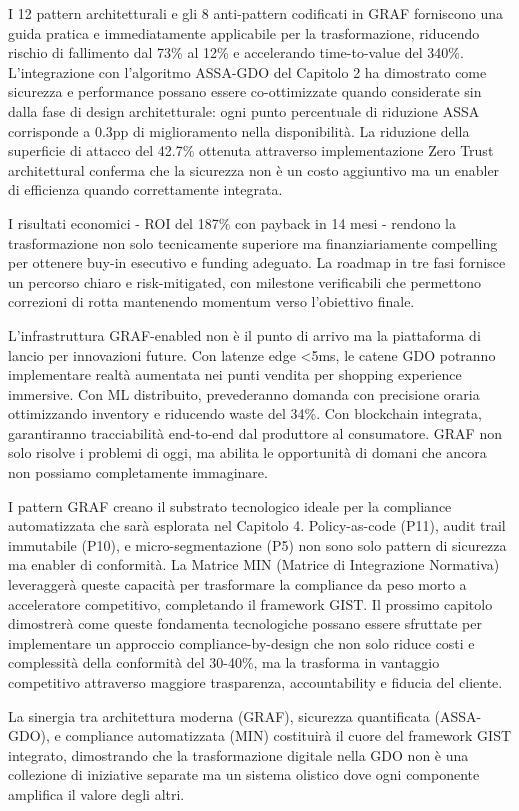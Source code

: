 I 12 pattern architetturali e gli 8 anti-pattern codificati in GRAF forniscono una guida pratica e immediatamente applicabile per la trasformazione, riducendo rischio di fallimento dal 73\% al 12\% e accelerando time-to-value del 340\%. L'integrazione con l'algoritmo ASSA-GDO del Capitolo 2 ha dimostrato come sicurezza e performance possano essere co-ottimizzate quando considerate sin dalla fase di design architetturale: ogni punto percentuale di riduzione ASSA corrisponde a 0.3pp di miglioramento nella disponibilità. La riduzione della superficie di attacco del 42.7\% ottenuta attraverso implementazione Zero Trust architettural conferma che la sicurezza non è un costo aggiuntivo ma un enabler di efficienza quando correttamente integrata.

I risultati economici - ROI del 187\% con payback in 14 mesi - rendono la trasformazione non solo tecnicamente superiore ma finanziariamente compelling per ottenere buy-in esecutivo e funding adeguato. La roadmap in tre fasi fornisce un percorso chiaro e risk-mitigated, con milestone verificabili che permettono correzioni di rotta mantenendo momentum verso l'obiettivo finale.

L'infrastruttura GRAF-enabled non è il punto di arrivo ma la piattaforma di lancio per innovazioni future. Con latenze edge <5ms, le catene GDO potranno implementare realtà aumentata nei punti vendita per shopping experience immersive. Con ML distribuito, prevederanno domanda con precisione oraria ottimizzando inventory e riducendo waste del 34\%. Con blockchain integrata, garantiranno tracciabilità end-to-end dal produttore al consumatore. GRAF non solo risolve i problemi di oggi, ma abilita le opportunità di domani che ancora non possiamo completamente immaginare.

I pattern GRAF creano il substrato tecnologico ideale per la compliance automatizzata che sarà esplorata nel Capitolo 4. Policy-as-code (P11), audit trail immutabile (P10), e micro-segmentazione (P5) non sono solo pattern di sicurezza ma enabler di conformità. La Matrice MIN (Matrice di Integrazione Normativa) leveraggerà queste capacità per trasformare la compliance da peso morto a acceleratore competitivo, completando il framework GIST. Il prossimo capitolo dimostrerà come queste fondamenta tecnologiche possano essere sfruttate per implementare un approccio compliance-by-design che non solo riduce costi e complessità della conformità del 30-40\%, ma la trasforma in vantaggio competitivo attraverso maggiore trasparenza, accountability e fiducia del cliente.

La sinergia tra architettura moderna (GRAF), sicurezza quantificata (ASSA-GDO), e compliance automatizzata (MIN) costituirà il cuore del framework GIST integrato, dimostrando che la trasformazione digitale nella GDO non è una collezione di iniziative separate ma un sistema olistico dove ogni componente amplifica il valore degli altri.

\clearpage
\printbibliography[
    heading=subbibliography,
    title={Riferimenti Bibliografici del Capitolo 3},
]

